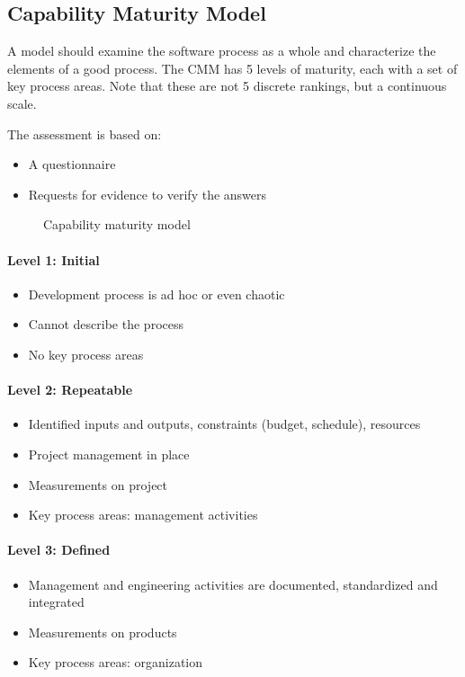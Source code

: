 \subsection{Capability Maturity Model}
A model should examine the software process as a whole and characterize
the elements of a good process. The CMM has 5 levels of maturity, each with a
set of key process areas. Note that these are not 5 discrete rankings, but a
continuous scale.\newline

The assessment is based on:
\begin{itemize}
    \item A questionnaire
    \item Requests for evidence to verify the answers
\end{itemize}

\begin{figure}[!ht]
    \centering
    \begin{scriptsize}
        
    \end{scriptsize}
    \caption{Capability maturity model}
\end{figure}

\paragraph{Level 1: Initial}
\begin{itemize}
    \item Development process is ad hoc or even chaotic
    \item Cannot describe the process
    \item No key process areas
\end{itemize}

\paragraph{Level 2: Repeatable}
\begin{itemize}
    \item Identified inputs and outputs, constraints (budget, schedule), resources
    \item Project management in place
    \item Measurements on project
    \item Key process areas: management activities
\end{itemize}

\paragraph{Level 3: Defined}
\begin{itemize}
    \item Management and engineering activities are documented, standardized and integrated
    \item Measurements on products
    \item Key process areas: organization
\end{itemize}

